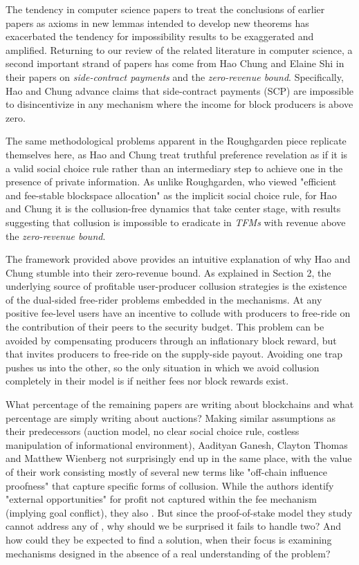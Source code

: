 \documentclass[sigconf,anonymous]{aamas}
\begin{document}
The tendency in computer science papers to treat the conclusions of earlier papers as axioms in new lemmas intended to develop new theorems has exacerbated the tendency for impossibility results to be exaggerated and amplified. Returning to our review of the related literature in computer science, a second important strand of papers has come from Hao Chung and Elaine Shi in their papers on \textit{side-contract payments} and the \textit{zero-revenue bound}. Specifically, Hao and Chung advance claims that side-contract payments (SCP) are impossible to disincentivize in any mechanism where the income for block producers is above zero.

The same methodological problems apparent in the Roughgarden piece replicate themselves here, as Hao and Chung treat truthful preference revelation as if it is a valid social choice rule rather than an intermediary step to achieve one in the presence of private information. As unlike Roughgarden, who viewed "efficient and fee-stable blockspace allocation" as the implicit social choice rule, for Hao and Chung it is the collusion-free dynamics that take center stage, with results suggesting that collusion is impossible to eradicate in \textit{TFMs} with revenue above the \textit{zero-revenue bound}.

The framework provided above provides an intuitive explanation of why Hao and Chung stumble into their zero-revenue bound. As explained in Section 2, the underlying source of profitable user-producer collusion strategies is the existence of the dual-sided free-rider problems embedded in the mechanisms. At any positive fee-level users have an incentive to collude with producers to free-ride on the contribution of their peers to the security budget. This problem can be avoided by compensating producers through an inflationary block reward, but that invites producers to free-ride on the supply-side payout. Avoiding one trap pushes us into the other, so the only situation in which we avoid collusion completely in their model is if neither fees nor block rewards exist.

What percentage of the remaining papers are writing about blockchains and what percentage are simply writing about auctions? Making similar assumptions as their predecessors (auction model, no clear social choice rule, costless manipulation of informational environment), Aadityan Ganesh, Clayton Thomas and Matthew Wienberg not surprisingly end up in the same place, with the value of their work consisting mostly of several new terms like "off-chain influence proofness" that capture specific forms of collusion. While the authors identify "external opportunities" for profit not captured within the fee mechanism (implying goal conflict), they also . But since the proof-of-stake model they study cannot address any of , why should we be surprised it fails to handle two? And how could they be expected to find a solution, when their focus is examining mechanisms designed in the absence of a real understanding of the problem?
\end{document}
